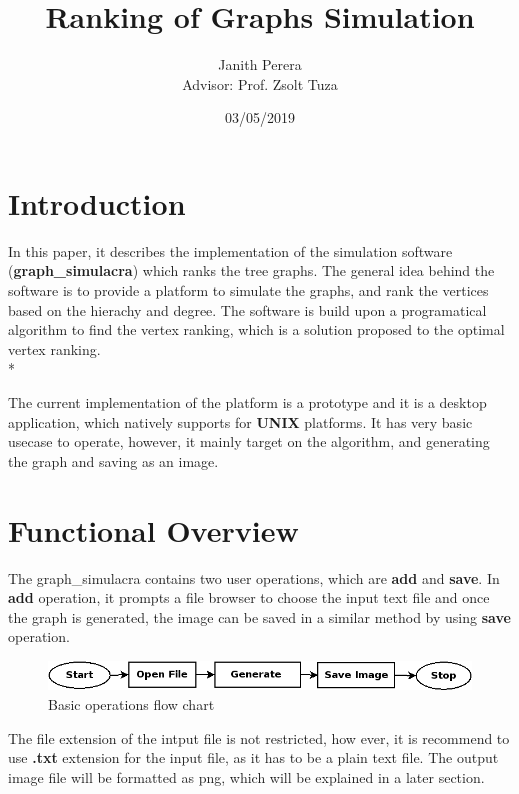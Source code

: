 \documentclass[11pt]{article}
\title{\textbf{Rank\textbf{}ing of Graphs Simulation}}
\author{Janith Perera\\[1cm]{\small Advisor: Prof. Zsolt Tuza}}
\date{03/05/2019}
\begin{document}
\maketitle
\pagebreak
\tableofcontents
\listoffigures
\pagebreak
\section{Introduction}

In this paper, it describes the implementation of the simulation software \big(\textbf{graph\_simulacra}) which ranks the tree graphs. The general idea behind the software is to provide a platform to simulate the graphs, and rank the vertices based on the hierachy and degree. The software is build upon a programatical algorithm to find the vertex ranking, which is a solution proposed to the optimal vertex ranking. \\*

\noindent
The current implementation of the platform is a prototype and it is a desktop application, which natively supports for \textbf{UNIX} platforms. It has very basic usecase to operate, however, it mainly target on the algorithm, and generating the graph and saving as an image. 




\section{Functional Overview}

The graph\_simulacra contains two user operations, which are \textbf{add} and \textbf{save}. In \textbf{add} operation, it prompts a file browser to choose the input text file and once the graph is generated, the image can be saved in a similar method by using \textbf{save} operation. 

\begin{figure}[ht]
\centering
     \includegraphics[width=1.0\textwidth]{Diagram1.png}
      \caption{Basic operations flow chart}
       \label{normal_case}
\end{figure}

\noindent
The file extension of the intput file is not restricted, how ever, it is recommend to use \textbf{.txt} extension for the input file, as it has to be a plain text file. The output image file will be formatted as png, which will be explained in a later section.
\end{document}
